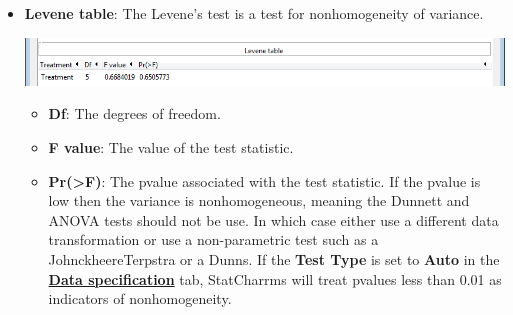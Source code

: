 \documentclass[a4paper]{article}
\begin{document}
\begin{enumerate}
\begin{itemize}
				\begin{itemize}
					\item \textbf{OBS}: The number of observations in the data set. 
					\item \textbf{STD}: The standard deviation of the residuals in the data set. 
					\item \textbf{SKEW}: The skew statistic [\hyperlink{R4}{4}]. Positive skew could indicate the right skewed 
						distribution while a negative skew could indicate the left skewed distribution. 
					\item \textbf{KURT}: The value of the kurtosis of the residuals. Kurtosis [\hyperlink{R15}{15}] is a measure of how heavy tailed a
						distribution is. A large kurtosis could be indicative of an outlier. 
					\item \textbf{SW\_STAT}: The value of the Shapiro\textendash{}Wilk test statistic. 
					\item \textbf{P\_VALUE}: The p\textendash{}value associated with the test statistic. 
					\item \textbf{Signif}: A significance flag which uses ``*'' for p\textendash{}value $\leq$  0.01 and a ``.'' otherwise.
				\end{itemize}	
		

			\item \textbf{Levene table}: The Levene's test is a test for non\textendash{}homogeneity of variance.  
				
				\hypertarget{fig:Leven}{}	
				\begin{center}
				\includegraphics[width=\textwidth,keepaspectratio]{Leven.png}
				\end{center} 
				
				\begin{itemize}
						
					\item \textbf{Df}: The degrees of freedom.  
					\item \textbf{F value}: The value of the test statistic.
					\item \textbf{Pr(>F)}: The p\textendash{}value associated with the test statistic. 
						If the p\textendash{}value is low then the variance 
						is non\textendash{}homogeneous, meaning the Dunnett and ANOVA tests should not be use.  
						In which case either use a different data transformation or use a non-parametric test such as a 
						Johnckheere\textendash{}Terpstra or a Dunns. 
						If the \textbf{Test Type} is set to \textbf{Auto} in the \hyperlink{fig:DataSpecTab}{\textbf{Data specification}} tab, 
						StatCharrms will treat p\textendash{}values less than 0.01 as indicators of non\textendash{}homogeneity. 
				\end{itemize}	
				

\end{itemize}
\end{enumerate}
\end{document}
